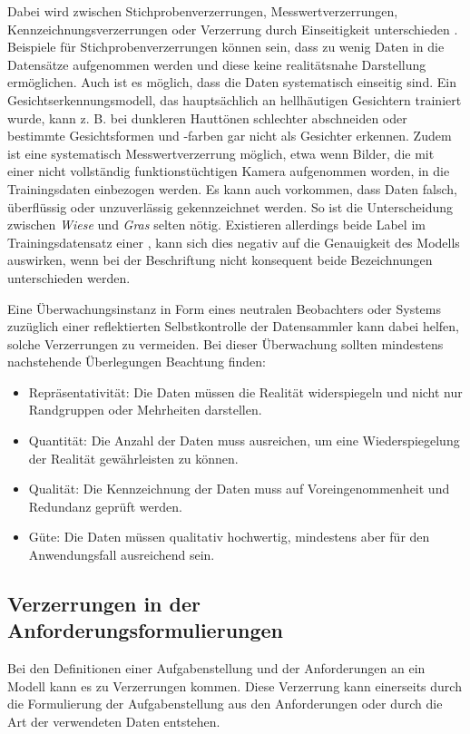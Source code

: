 \documentclass[12pt]{report}
\begin{document}
Dabei wird zwischen Stichprobenverzerrungen, Messwertverzerrungen, Kennzeichnungsverzerrungen oder Verzerrung durch Einseitigkeit unterschieden \cite[S. 48ff.]{Srinivasan}.
Beispiele für Stichprobenverzerrungen können sein, dass zu wenig Daten in die Datensätze aufgenommen werden und diese keine realitätsnahe Darstellung ermöglichen.
Auch ist es möglich, dass die Daten systematisch einseitig sind. Ein Gesichtserkennungsmodell, das hauptsächlich an hellhäutigen Gesichtern trainiert wurde, kann z. B. bei dunkleren Hauttönen schlechter abschneiden oder bestimmte Gesichtsformen und -farben gar nicht als Gesichter erkennen.
Zudem ist eine systematisch Messwertverzerrung möglich, etwa wenn Bilder, die mit einer nicht vollständig funktionstüchtigen Kamera aufgenommen worden, in die Trainingsdaten einbezogen werden.
Es kann auch vorkommen, dass Daten falsch, überflüssig oder unzuverlässig gekennzeichnet werden. So ist die Unterscheidung zwischen \textit{Wiese} und \textit{Gras} selten nötig. Existieren allerdings beide Label im Trainingsdatensatz einer , kann sich dies negativ auf die Genauigkeit des Modells auswirken, wenn bei der Beschriftung nicht konsequent beide Bezeichnungen unterschieden werden\cite[S. 48ff.]{Srinivasan}. 

Eine Überwachungsinstanz in Form eines neutralen Beobachters oder Systems zuzüglich einer reflektierten Selbstkontrolle der Datensammler kann dabei helfen, solche Verzerrungen zu vermeiden.
Bei dieser Überwachung sollten mindestens nachstehende Überlegungen Beachtung finden: %
\begin{itemize}

    \item Repräsentativität: Die Daten müssen die Realität widerspiegeln und nicht nur Randgruppen oder Mehrheiten darstellen.
    \item Quantität: Die Anzahl der Daten muss ausreichen,  um eine Wiederspiegelung der Realität gewährleisten zu können.
    \item Qualität: Die Kennzeichnung der Daten muss auf Voreingenommenheit und Redundanz geprüft werden.
    \item Güte: Die Daten müssen qualitativ hochwertig, mindestens aber für den Anwendungsfall ausreichend sein.

\end{itemize}

\subsection{Verzerrungen in der Anforderungsformulierungen}
Bei den Definitionen einer Aufgabenstellung und der Anforderungen an ein Modell kann es zu Verzerrungen kommen. Diese Verzerrung kann einerseits durch die Formulierung der Aufgabenstellung aus den Anforderungen oder durch die Art der verwendeten Daten entstehen.  \cite[S. 51f.]{Srinivasan} 
\end{document}
